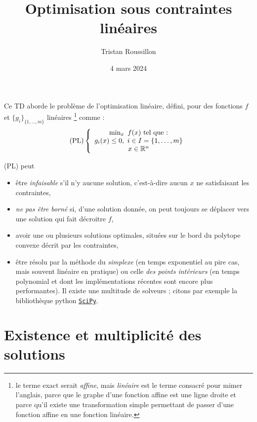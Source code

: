 \documentclass[a4paper,francais]{article}
\title{Optimisation sous contraintes linéaires}
\author{Tristan Roussillon}
\date{4 mars 2024}
\newcommand{\R}{{\ensuremath\mathbb{R}}}
\theoremstyle{definition}
\begin{document}
\maketitle

Ce TD aborde le problème de l'optimisation linéaire, défini,
pour des fonctions $f$ et $\{g_i\}_{\{1, \dots, m\}}$ linéaires
\footnote{le terme exact serait \emph{affine}, mais \emph{linéaire}
  est le terme consacré pour mimer l'anglais, parce que le graphe
  d'une fonction affine est une ligne droite et parce qu'il
  existe une transformation simple permettant de passer d'une
  fonction affine en une fonction linéaire.}
comme :
\[
\text{(PL)} \left\{
\begin{array}{c}
  \min_{x} \ f(x) \ \text{tel que :} \\
  g_i(x) \leq 0, \ i \in I = \{1, \dots, m\} \\
  x \in  \R^n \\
\end{array}
\right.
\]

(PL) peut
\begin{itemize}
\item être \emph{infaisable} s'il n'y aucune solution,
  c'est-à-dire aucun $x$ ne satisfaisant les contraintes,
\item \emph{ne pas être borné} si, d'une solution donnée, on peut
  toujours se déplacer vers une solution qui fait décroitre $f$,
\item avoir une ou plusieurs solutions optimales, situées
  sur le bord du polytope convexe décrit par les contraintes,
\item être résolu par la méthode du \emph{simplexe}
  (en temps exponentiel au pire cas, mais souvent linéaire en
  pratique) ou celle \emph{des points intérieurs} (en temps
  polynomial et dont les implémentations récentes sont encore
  plus performantes). Il existe une multitude de solveurs ;
  citons par exemple la bibliothèque python
  \href{https://docs.scipy.org/doc/}{\texttt{SciPy}}.
\end{itemize} 

\section{Existence et multiplicité des solutions}
\label{sec:sol}
\end{document}
